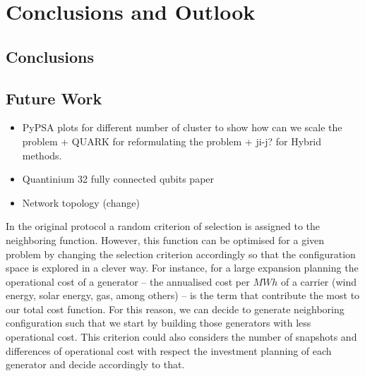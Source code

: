 
\chapter{Conclusions and Outlook} %

\label{Chapter5} %




\section{Conclusions}

\section{Future Work}
\begin{itemize}
    \item PyPSA plots for different number of cluster to show how can we scale the problem + QUARK for reformulating the problem + ji-j? for Hybrid methods.
    \item Quantinium 32 fully connected qubits paper
    \item Network topology (change)
\end{itemize}

In the original protocol a random criterion of selection is assigned to the neighboring function. However, this function can be optimised for a given problem by changing the selection criterion accordingly so that the configuration space is explored in a clever way. For instance, for a large expansion planning the operational cost of a generator -- the annualised cost per $MWh$ of a carrier (wind energy, solar energy, gas, among others) --  is the term that contribute the most to our total cost function. For this reason, we can decide to generate neighboring configuration such that we start by building those generators with less operational cost. This criterion could also considers the number of snapshots and differences of operational cost with respect the investment planning of each generator and decide accordingly to that.
